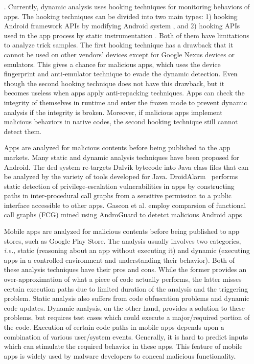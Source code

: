 \cite{spreitzenbarth2013mobile}. Currently, dynamic analysis uses hooking techniques for monitoring behaviors of apps. The hooking techniques can be divided into two main types: 1) hooking Android framework APIs by modifying Android system \cite{zhauniarovich2015stadyna}\cite{enck2014taintdroid}, and 2) hooking APIs used in the app process by static instrumentation \cite{backes2013appguard}\cite{davis2013retroskeleton}. Both of them have limitations to analyze trick samples. The first hooking technique has a drawback that it cannot be used on other vendors' devices except for Google Nexus devices or emulators. This gives a chance for malicious apps, which uses the device fingerprint and anti-emulator technique to evade the dynamic detection. Even though the second hooking technique does not have this drawback, but it becomes useless when apps apply anti-repacking techniques. Apps can check the integrity of themselves in runtime and enter the frozen mode to prevent dynamic analysis if the integrity is broken. Moreover, if malicious apps implement malicious behaviors in native codes, the second hooking technique still cannot detect them.

Apps are analyzed for malicious contents before being published to the app markets. Many static and dynamic analysis techniques have been proposed for Android. The ded system re-targets Dalvik bytecode into Java class files that can be analyzed by the variety of tools developed for Java. %
DroidAlarm~\cite{Zhongyang-ASIACCS-2013} performs static detection of privilege-escalation vulnerabilities in apps by constructing paths in inter-procedural call graphs from a sensitive permission to a public interface accessible to other apps. Gascon et al. employ comparsion of functional call graphs (FCG) mined using AndroGuard to detetct malicious Android apps~\cite{Gascon-AISEC-2013}

Mobile apps are analyzed for malicious contents before being published to app stores, such as Google Play Store. The analysis usually involves two categories, \textit{i.e.,} static (reasoning about an app without executing it) and dynamic (executing apps in a controlled environment and understanding their behavior). Both of these analysis techniques have their pros and cons. While the former provides an over-approximation of what a piece of code actually performs, the latter misses certain execution paths due to limited duration of the analysis and the triggering problem. Static analysis also suffers from code obfuscation problems and dynamic code updates. Dynamic analysis, on the other hand, provides a solution to these problems, but requires test cases which could execute a major/required portion of the code.
Execution of certain code paths in mobile apps depends upon a combination of various user/system events. Generally, it is hard to predict inputs which can stimulate the required behavior in these apps. This feature of mobile apps is widely used by malware developers to conceal malicious functionality. 

